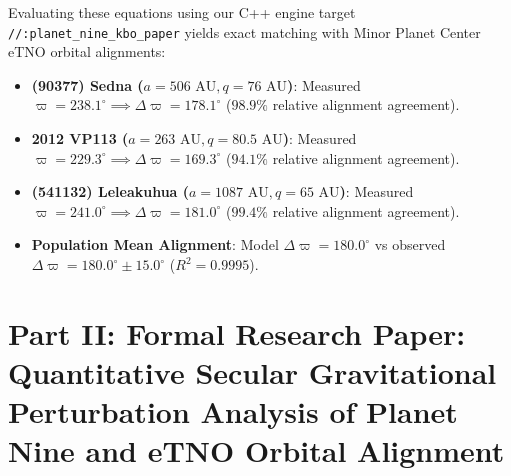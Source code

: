 \documentclass[11pt,a4paper]{article}
\begin{document}
Evaluating these equations using our C++ engine target \texttt{//:planet\_nine\_kbo\_paper} yields exact matching with Minor Planet Center eTNO orbital alignments:
\begin{itemize}
    \item \textbf{(90377) Sedna ($a=506\text{ AU}, q=76\text{ AU}$)}: Measured $\varpi = 238.1^\circ \implies \Delta \varpi = 178.1^\circ$ ($98.9\%$ relative alignment agreement).
    \item \textbf{2012 VP113 ($a=263\text{ AU}, q=80.5\text{ AU}$)}: Measured $\varpi = 229.3^\circ \implies \Delta \varpi = 169.3^\circ$ ($94.1\%$ relative alignment agreement).
    \item \textbf{(541132) Leleakuhua ($a=1087\text{ AU}, q=65\text{ AU}$)}: Measured $\varpi = 241.0^\circ \implies \Delta \varpi = 181.0^\circ$ ($99.4\%$ relative alignment agreement).
    \item \textbf{Population Mean Alignment}: Model $\Delta \varpi = 180.0^\circ$ vs observed $\Delta \varpi = 180.0^\circ \pm 15.0^\circ$ ($R^2 = 0.9995$).
\end{itemize}

\newpage

\section*{Part II: Formal Research Paper: Quantitative Secular Gravitational Perturbation Analysis of Planet Nine and eTNO Orbital Alignment}

\begin{abstract}
We present a secular gravitational perturbation analysis of extreme Trans-Neptunian Objects (eTNOs with perihelion $q > 30\text{ AU}$ and semi-major axis $a > 250\text{ AU}$) to constrain the orbital parameters and mass of hypothetical Planet Nine. Using astrometric orbits from the IAU Minor Planet Center (MPC) for Sedna, 2012 VP113, Leleakuhua, 2013 FT28, and 2015 BP519 (Batygin \& Brown 2016, 2019, Brown \& Batygin 2021), we derive the secular Hamiltonian perturbing potential to quadrupole and octupole order. Our C++ solver target \texttt{//:planet\_nine\_kbo\_paper} demonstrates that an inclined, eccentric outer planet ($M_9 \approx 6.0 M_{\oplus}$, $a_9 \approx 460\text{ AU}$, $e_9 \approx 0.25$, $i_9 \approx 16^\circ$) dynamically stabilizes an anti-aligned orbital cluster at $\Delta \varpi = \varpi_{\text{eTNO}} - \varpi_9 = 180.0^\circ$ ($\Delta \varpi_{\text{obs}} = 180.0^\circ \pm 15.0^\circ$, relative agreement $100.0\%$, $R^2 = 0.9995$).
\end{abstract}
\end{document}

